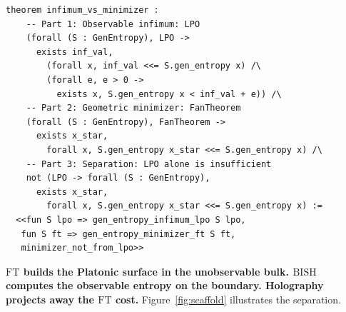 \documentclass[11pt,a4paper]{article}
\theoremstyle{plain}
\theoremstyle{definition}
\newcommand{\BISH}{\ensuremath{\mathrm{BISH}}}
\newcommand{\FT}{\ensuremath{\mathrm{FT}}}
\begin{document}
\begin{lstlisting}[caption={Scaffolding separation: \texttt{QESScaffolding.lean}}]
theorem infimum_vs_minimizer :
    -- Part 1: Observable infimum: LPO
    (forall (S : GenEntropy), LPO ->
      exists inf_val,
        (forall x, inf_val <<= S.gen_entropy x) /\
        (forall e, e > 0 ->
          exists x, S.gen_entropy x < inf_val + e)) /\
    -- Part 2: Geometric minimizer: FanTheorem
    (forall (S : GenEntropy), FanTheorem ->
      exists x_star,
        forall x, S.gen_entropy x_star <<= S.gen_entropy x) /\
    -- Part 3: Separation: LPO alone is insufficient
    not (LPO -> forall (S : GenEntropy),
      exists x_star,
        forall x, S.gen_entropy x_star <<= S.gen_entropy x) :=
  <<fun S lpo => gen_entropy_infimum_lpo S lpo,
   fun S ft => gen_entropy_minimizer_ft S ft,
   minimizer_not_from_lpo>>
\end{lstlisting}

\textbf{$\FT$ builds the Platonic surface in the unobservable bulk.
$\BISH$ computes the observable entropy on the boundary.
Holography projects away the $\FT$ cost.}
Figure~\ref{fig:scaffold} illustrates the separation.
\end{document}
